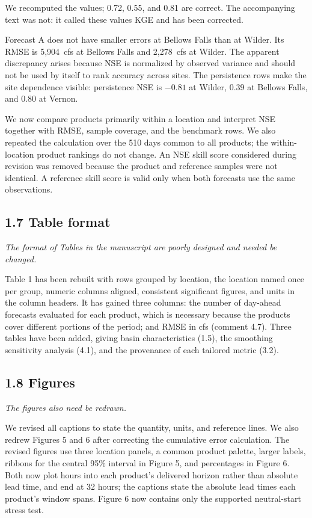 \documentclass[11pt]{article}
\newenvironment{rc}%
  {\begin{list}{}{\setlength{\leftmargin}{1.5em}\setlength{\rightmargin}{1.5em}%
   \setlength{\topsep}{0.2em}\setlength{\parsep}{0pt}\setlength{\itemsep}{0pt}}%
   \item[]\itshape\color{quotegray}}%
  {\end{list}}
\begin{document}
We recomputed the values; 0.72, 0.55, and 0.81 are correct. The accompanying text was not:
it called these values KGE and has been corrected.

Forecast A does not have smaller errors at Bellows Falls than at Wilder. Its RMSE is
5,904~cfs at Bellows Falls and 2,278~cfs at Wilder. The apparent discrepancy arises because
NSE is normalized by observed variance and should not be used by itself to rank accuracy
across sites. The persistence rows make the site dependence visible: persistence NSE is
$-0.81$ at Wilder, 0.39 at Bellows Falls, and 0.80 at Vernon.

We now compare products primarily within a location and interpret NSE together with RMSE,
sample coverage, and the benchmark rows. We also repeated the calculation over the 510 days
common to all products; the within-location product rankings do not change. An NSE skill
score considered during revision was removed because the product and reference samples were
not identical. A reference skill score is valid only when both forecasts use the same
observations.

\subsection*{1.7 Table format}

\begin{rc}
The format of Tables in the manuscript are poorly designed and needed be changed.
\end{rc}

Table 1 has been rebuilt with rows grouped by location, the location named once per
group, numeric columns aligned, consistent significant figures, and units in the column
headers. It has gained three columns: the number of day-ahead forecasts evaluated for each
product, which is necessary because the products cover different portions of the period;
and RMSE in cfs (comment 4.7).
Three tables have been added, giving basin characteristics (1.5), the smoothing sensitivity
analysis (4.1), and the provenance of each tailored metric (3.2).

\subsection*{1.8 Figures}

\begin{rc}
The figures also need be redrawn.
\end{rc}

We revised all captions to state the quantity, units, and reference lines. We also redrew
Figures 5 and 6 after correcting the cumulative error calculation. The revised figures use
three location panels, a common product palette, larger labels, ribbons for the central 95\%
interval in Figure 5, and percentages in Figure 6. Both now plot hours into each product's
delivered horizon rather than absolute lead time, and end at 32 hours; the captions state the
absolute lead times each product's window spans. Figure 6 now contains only the supported
neutral-start stress test.
\end{document}
